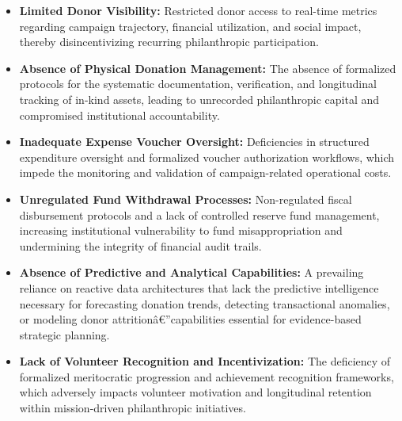 \begin{itemize} \item \textbf{Limited Donor Visibility:} Restricted donor access to real-time metrics regarding campaign trajectory, financial utilization, and social impact, thereby disincentivizing recurring philanthropic participation. \end{itemize}

\begin{itemize} \item \textbf{Absence of Physical Donation Management:} The absence of formalized protocols for the systematic documentation, verification, and longitudinal tracking of in-kind assets, leading to unrecorded philanthropic capital and compromised institutional accountability. \end{itemize}

\begin{itemize} \item \textbf{Inadequate Expense Voucher Oversight:} Deficiencies in structured expenditure oversight and formalized voucher authorization workflows, which impede the monitoring and validation of campaign-related operational costs. \end{itemize}

\begin{itemize} \item \textbf{Unregulated Fund Withdrawal Processes:} Non-regulated fiscal disbursement protocols and a lack of controlled reserve fund management, increasing institutional vulnerability to fund misappropriation and undermining the integrity of financial audit trails. \end{itemize}

\begin{itemize} \item \textbf{Absence of Predictive and Analytical Capabilities:} A prevailing reliance on reactive data architectures that lack the predictive intelligence necessary for forecasting donation trends, detecting transactional anomalies, or modeling donor attritionâ€”capabilities essential for evidence-based strategic planning. \end{itemize}

\begin{itemize} \item \textbf{Lack of Volunteer Recognition and Incentivization:} The deficiency of formalized meritocratic progression and achievement recognition frameworks, which adversely impacts volunteer motivation and longitudinal retention within mission-driven philanthropic initiatives. \end{itemize}

